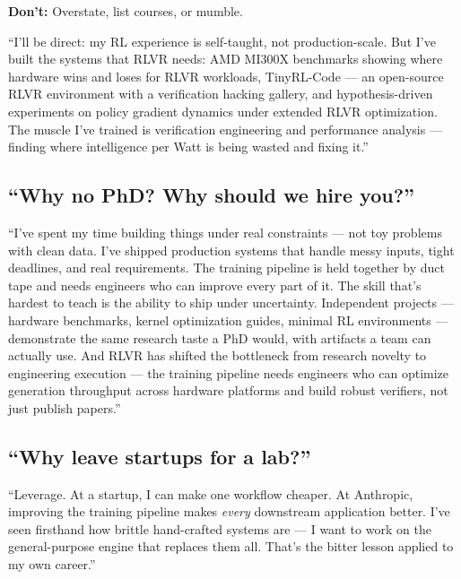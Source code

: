 \textbf{Don't:} Overstate, list courses, or mumble.

\begin{sayit}
``I'll be direct: my RL experience is self-taught, not production-scale. But I've built the systems that RLVR needs: AMD MI300X benchmarks showing where hardware wins and loses for RLVR workloads, TinyRL-Code --- an open-source RLVR environment with a verification hacking gallery, and hypothesis-driven experiments on policy gradient dynamics under extended RLVR optimization. The muscle I've trained is verification engineering and performance analysis --- finding where intelligence per Watt is being wasted and fixing it.''
\end{sayit}

\subsection{``Why no PhD? Why should we hire you?''}

\begin{sayit}[No PhD]
``I've spent my time building things under real constraints --- not toy problems with clean data. I've shipped production systems that handle messy inputs, tight deadlines, and real requirements. The training pipeline is held together by duct tape and needs engineers who can improve every part of it. The skill that's hardest to teach is the ability to ship under uncertainty. Independent projects --- hardware benchmarks, kernel optimization guides, minimal RL environments --- demonstrate the same research taste a PhD would, with artifacts a team can actually use. And RLVR has shifted the bottleneck from research novelty to engineering execution --- the training pipeline needs engineers who can optimize generation throughput across hardware platforms and build robust verifiers, not just publish papers.''
\end{sayit}

\subsection{``Why leave startups for a lab?''}

\begin{sayit}
``Leverage. At a startup, I can make one workflow cheaper. At Anthropic, improving the training pipeline makes \textit{every} downstream application better. I've seen firsthand how brittle hand-crafted systems are --- I want to work on the general-purpose engine that replaces them all. That's the bitter lesson applied to my own career.''
\end{sayit}

